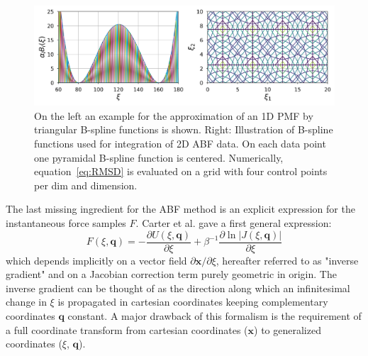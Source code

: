 \begin{figure}[H]
    \centering
    \includegraphics[width=1\textwidth]{bilder/FEM}
    \caption{
      On the left an example for the approximation of an 1D PMF by triangular B-spline functions is shown.
      Right: Illustration of B-spline functions used for integration of 2D ABF data. On each data point one pyramidal B-spline function is centered. Numerically, equation~\ref{eq:RMSD} is evaluated on a grid with four control points per dim and dimension.
    }
\label{fig:FEM}%
\end{figure}
The last missing ingredient for the ABF method is an explicit expression for the instantaneous force samples $F$. Carter et al.\autocite{carter1989constrained} gave a first general expression:
\begin{equation}
  F(\xi,\textbf{q}) = -\frac{\partial U(\xi,\textbf{q})}{\partial \xi} + \beta^{-1} \frac{\partial \ln|J(\xi,\textbf{q})|}{\partial\xi} \label{eq:instforce old}
\end{equation}
which depends implicitly on a vector field $\partial \textbf{x} / \partial \xi$, hereafter referred to as "inverse gradient" and on a Jacobian correction term purely geometric in origin. The inverse gradient can be thought of as the direction along which an infinitesimal change in $\xi$ is propagated in cartesian coordinates keeping complementary coordinates $\textbf{q}$ constant. A major drawback of this formalism is the requirement of a full coordinate transform from cartesian coordinates ($\textbf{x}$) to generalized coordinates ($\xi$, $\textbf{q}$).


